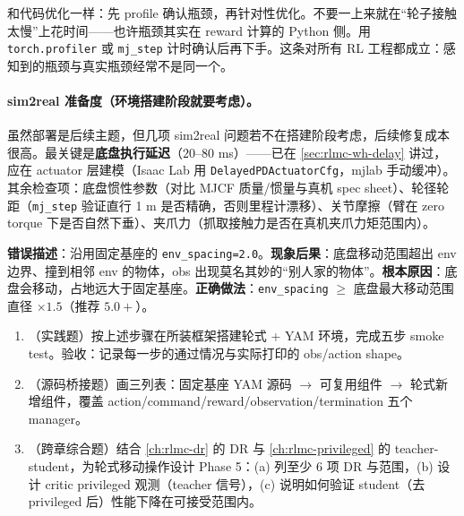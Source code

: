 \begin{insight}\label{ins:rlmc-wh-profile}
和代码优化一样：先 profile 确认瓶颈，再针对性优化。不要一上来就在“轮子接触太慢”上花时间——也许瓶颈其实在 reward 计算的 Python 侧。用 \verb|torch.profiler| 或 \verb|mj_step| 计时确认后再下手。这条对所有 RL 工程都成立：感知到的瓶颈与真实瓶颈经常不是同一个。
\end{insight}

\paragraph{sim2real 准备度（环境搭建阶段就要考虑）。}虽然部署是后续主题，但几项 sim2real 问题若不在搭建阶段考虑，后续修复成本很高。最关键是\textbf{底盘执行延迟}（$20$--$80$ ms）——已在 \cref{sec:rlmc-wh-delay} 讲过，应在 actuator 层建模（Isaac Lab 用 \verb|DelayedPDActuatorCfg|，mjlab 手动缓冲）。其余检查项：底盘惯性参数（对比 MJCF 质量/惯量与真机 spec sheet）、轮径轮距（\verb|mj_step| 验证直行 1 m 是否精确，否则里程计漂移）、关节摩擦（臂在 zero torque 下是否自然下垂）、夹爪力（抓取接触力是否在真机夹爪力矩范围内）。

\begin{pitfall}
\textbf{错误描述}：沿用固定基座的 \verb|env_spacing=2.0|。\textbf{现象后果}：底盘移动范围超出 env 边界、撞到相邻 env 的物体，obs 出现莫名其妙的“别人家的物体”。\textbf{根本原因}：底盘会移动，占地远大于固定基座。\textbf{正确做法}：\verb|env_spacing| $\ge$ 底盘最大移动范围直径 $\times 1.5$（推荐 $5.0+$）。
\end{pitfall}

\begin{practice}[集成实战]
\begin{enumerate}
\item （实践题）按上述步骤在所装框架搭建轮式 + YAM 环境，完成五步 smoke test。验收：记录每一步的通过情况与实际打印的 obs/action shape。
\item （源码桥接题）画三列表：固定基座 YAM 源码 $\to$ 可复用组件 $\to$ 轮式新增组件，覆盖 action/command/reward/observation/termination 五个 manager。
\item （跨章综合题）结合 \cref{ch:rlmc-dr} 的 DR 与 \cref{ch:rlmc-privileged} 的 teacher-student，为轮式移动操作设计 Phase 5：(a) 列至少 6 项 DR 与范围，(b) 设计 critic privileged 观测（teacher 信号），(c) 说明如何验证 student（去 privileged 后）性能下降在可接受范围内。
\end{enumerate}
\end{practice}

